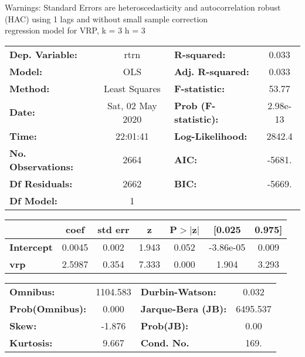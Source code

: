 Warnings: \newline
 [1] Standard Errors are heteroscedasticity and autocorrelation robust (HAC) using 1 lags and without small sample correction\\ 

regression model for VRP, k = 3 h = 3\begin{center}
\begin{tabular}{lclc}
\toprule
\textbf{Dep. Variable:}    &       rtrn       & \textbf{  R-squared:         } &     0.033   \\
\textbf{Model:}            &       OLS        & \textbf{  Adj. R-squared:    } &     0.033   \\
\textbf{Method:}           &  Least Squares   & \textbf{  F-statistic:       } &     53.77   \\
\textbf{Date:}             & Sat, 02 May 2020 & \textbf{  Prob (F-statistic):} &  2.98e-13   \\
\textbf{Time:}             &     22:01:41     & \textbf{  Log-Likelihood:    } &    2842.4   \\
\textbf{No. Observations:} &        2664      & \textbf{  AIC:               } &    -5681.   \\
\textbf{Df Residuals:}     &        2662      & \textbf{  BIC:               } &    -5669.   \\
\textbf{Df Model:}         &           1      & \textbf{                     } &             \\
\bottomrule
\end{tabular}
\begin{tabular}{lcccccc}
                   & \textbf{coef} & \textbf{std err} & \textbf{z} & \textbf{P$> |$z$|$} & \textbf{[0.025} & \textbf{0.975]}  \\
\midrule
\textbf{Intercept} &       0.0045  &        0.002     &     1.943  &         0.052        &    -3.86e-05    &        0.009     \\
\textbf{vrp}       &       2.5987  &        0.354     &     7.333  &         0.000        &        1.904    &        3.293     \\
\bottomrule
\end{tabular}
\begin{tabular}{lclc}
\textbf{Omnibus:}       & 1104.583 & \textbf{  Durbin-Watson:     } &    0.032  \\
\textbf{Prob(Omnibus):} &   0.000  & \textbf{  Jarque-Bera (JB):  } & 6495.537  \\
\textbf{Skew:}          &  -1.876  & \textbf{  Prob(JB):          } &     0.00  \\
\textbf{Kurtosis:}      &   9.667  & \textbf{  Cond. No.          } &     169.  \\
\bottomrule
\end{tabular}
\end{center}

